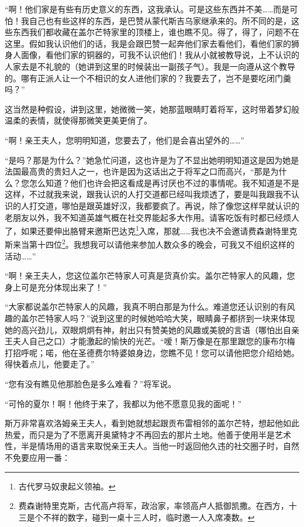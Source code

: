 \par “啊！他们家是有些有历史意义的东西，这我承认。可是这些东西并不美……而是可怕！我自己也有些这样的东西，是巴赞从蒙代斯吉乌家继承来的。所不同的是，这些东西我们都收藏在盖尔芒特家里的顶楼上，谁也瞧不见。得了，得了，问题不在这里。假如我认识他们的话，我是会跟巴赞一起奔他们家去看他们，看他们家的狮身人面像，看他们家的铜器的，可我不认识他们！我从小就被教导说，上不认识的人家去是不礼貌的（她讲到这里的时候装出一副孩子气）。我是一向遵从这个教导的。哪有正派人让一个不相识的女人进他们家的？我要去了，岂不是要吃闭门羹吗？”
\par 这当然是种假设，讲到这里，她微微一笑，她那蓝眼睛盯着将军，这时带着梦幻般温柔的表情，就使得那微笑更美更俏了。
\par “啊！亲王夫人，您明明知道，您要去了，他们是会喜出望外的……”
\par “是吗？那是为什么？”她急忙问道，这也许是为了不显出她明明知道这是因为她是法国最高贵的贵妇人之一，也许是因为这话出之于将军之口而高兴，“那是为什么？您怎么知道？他们也许会把这看成是再讨厌也不过的事情呢。我不知道是不是这样，不过就我来说，跟我认识的人打交道都已经叫我烦透了，要是叫我跟我不认识的人打交道，哪怕是跟英雄好汉，我都要疯了。再说，除了像您这样早就认识的老朋友以外，我不知道英雄气概在社交界能起多大作用。请客吃饭有时都已经烦人了，如果还要伸出胳臂来邀斯巴达克\footnote{古代罗马奴隶起义领袖。}入席，那就……我也决不会邀请费森谢特里克斯来当第十四位\footnote{费森谢特里克斯，古代高卢将军，政治家，率领高卢人抵御凯撒。在西方，十三是个不祥的数字，碰到一桌十三人时，临时邀一人入席凑数。}。我想我可以请他来参加人数众多的晚会，可我又不组织这样的活动……”
\par “啊！亲王夫人，您这位盖尔芒特家人可真是货真价实。盖尔芒特家人的风趣，您身上可是充分体现出来了！”
\par “大家都说盖尔芒特家人的风趣，我真不明白那是为什么。难道您还认识别的有风趣的盖尔芒特家人吗？”说到这里的时候她哈哈大笑，眼睛鼻子都挤到一块来体现她的高兴劲儿，双眼炯炯有神，射出只有赞美她的风趣或美貌的言语（哪怕出自亲王夫人自己之口）才能激起的愉快的光芒。“嗳！斯万像是在那里跟您的康布尔梅打招呼呢；喏，他在圣德费尔特婆娘身边，您瞧不见！您可以请他把您介绍给她。得快着点儿，他要走了。”
\par “您有没有瞧见他那脸色是多么难看？”将军说。
\par “可怜的夏尔！啊！他终于来了，我都以为他不愿意见我的面呢！”
\par 斯万非常喜欢洛姆亲王夫人，看到她就想起跟贡布雷相邻的盖尔芒特，想起他如此热爱，而只是为了不愿离开奥黛特才不再回去的那片土地。他善于使用半是艺术性，半是情场用的语言来取悦亲王夫人。当他一时返回他久违的社交圈子时，自然不免要应用一番：
